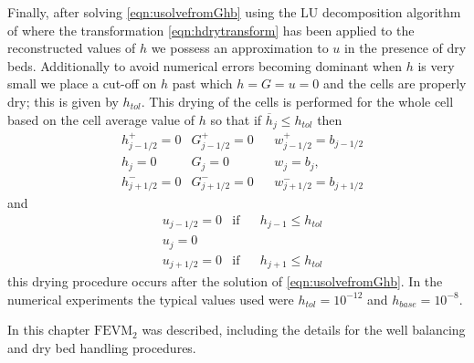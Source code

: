 Finally, after solving \eqref{eqn:usolvefromGhb} using the LU decomposition algorithm of \citet{NumRecC-1996} where the transformation \eqref{eqn:hdrytransform} has been applied to the reconstructed values of $h$ we possess an approximation to $u$ in the presence of dry beds. Additionally to avoid numerical errors becoming dominant when $h$ is very small we place a cut-off on $h$ past which $h=G= u = 0$ and the cells are properly dry; this is given by $h_{tol}$. This drying of the cells is performed for the whole cell based on the cell average value of $h$ so that if $\overline{h}_j \le h_{tol}$ then
\begin{align*}
 & 	h^+_{j-1/2}  = 0   & 	G^+_{j-1/2}  = 0  & & 	w^+_{j-1/2}  = b_{j-1/2}   \\
 &	h_{j} = 0 & 	G_{j}  = 0  & 	&w_{j}  = b_{j},\\
 & 	h^-_{j+1/2}  = 0  & 	G^-_{j+1/2}  = 0 & 	&w^-_{j+1/2}  = b_{j+1/2} 
 \end{align*}
 and
 \begin{align*}
 & 	u_{j-1/2}  = 0  &\text{if}& &h_{j-1}\le h_{tol} \\
 & 	u_{j}  = 0 \\
 & 	u_{j+1/2}  = 0  &\text{if}& &h_{j+1} \le h_{tol}
\end{align*}
this drying procedure occurs after the solution of \eqref{eqn:usolvefromGhb}. In the numerical experiments the typical values used were $h_{tol} = 10^{-12}$ and $h_{base} = 10^{-8}$.

\medskip

In this chapter $\text{FEVM}_2$ was described, including the details for the well balancing and dry bed handling procedures. 
